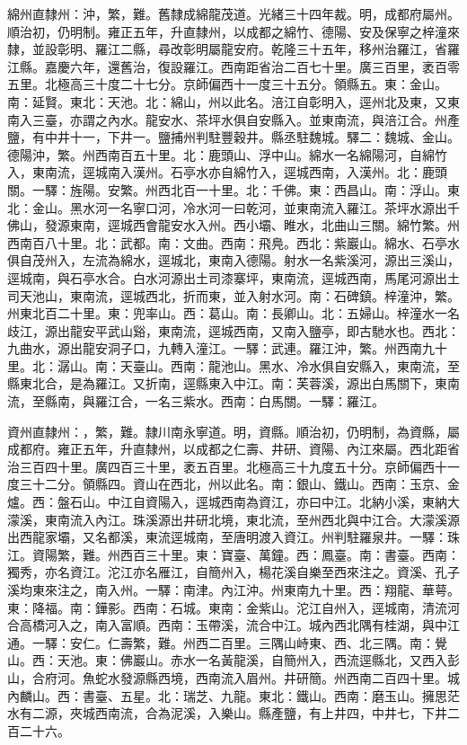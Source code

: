\begin{pinyinscope}
綿州直隸州：沖，繁，難。舊隸成綿龍茂道。光緒三十四年裁。明，成都府屬州。順治初，仍明制。雍正五年，升直隸州，以成都之綿竹、德陽、安及保寧之梓潼來隸，並設彰明、羅江二縣，尋改彰明屬龍安府。乾隆三十五年，移州治羅江，省羅江縣。嘉慶六年，還舊治，復設羅江。西南距省治二百七十里。廣三百里，袤百零五里。北極高三十度二十七分。京師偏西十一度三十五分。領縣五。東：金山。南：延賢。東北：天池。北：綿山，州以此名。涪江自彰明入，逕州北及東，又東南入三臺，亦謂之內水。龍安水、茶坪水俱自安縣入。並東南流，與涪江合。州產鹽，有中井十一，下井一。鹽捕州判駐豐穀井。縣丞駐魏城。驛二：魏城、金山。德陽沖，繁。州西南百五十里。北：鹿頭山、浮中山。綿水一名綿陽河，自綿竹入，東南流，逕城南入漢州。石亭水亦自綿竹入，逕城西南，入漢州。北：鹿頭關。一驛：旌陽。安繁。州西北百一十里。北：千佛。東：西昌山。南：浮山。東北：金山。黑水河一名寧口河，冷水河一曰乾河，並東南流入羅江。茶坪水源出千佛山，發源東南，逕城西會龍安水入州。西小壩、睢水，北曲山三關。綿竹繁。州西南百八十里。北：武都。南：文曲。西南：飛鳧。西北：紫巖山。綿水、石亭水俱自茂州入，左流為綿水，逕城北，東南入德陽。射水一名紫溪河，源出三溪山，逕城南，與石亭水合。白水河源出土司漆寨坪，東南流，逕城西南，馬尾河源出土司天池山，東南流，逕城西北，折而東，並入射水河。南：石碑鎮。梓潼沖，繁。州東北百二十里。東：兜率山。西：葛山。南：長卿山。北：五婦山。梓潼水一名歧江，源出龍安平武山谿，東南流，逕城西南，又南入鹽亭，即古馳水也。西北：九曲水，源出龍安洞子口，九轉入潼江。一驛：武連。羅江沖，繁。州西南九十里。北：潺山。南：天臺山。西南：龍池山。黑水、冷水俱自安縣入，東南流，至縣東北合，是為羅江。又折南，逕縣東入中江。南：芙蓉溪，源出白馬關下，東南流，至縣南，與羅江合，一名三紫水。西南：白馬關。一驛：羅江。

資州直隸州：，繁，難。隸川南永寧道。明，資縣。順治初，仍明制，為資縣，屬成都府。雍正五年，升直隸州，以成都之仁壽、井研、資陽、內江來屬。西北距省治三百四十里。廣四百三十里，袤五百里。北極高三十九度五十分。京師偏西十一度三十二分。領縣四。資山在西北，州以此名。南：銀山、鐵山。西南：玉京、金爐。西：盤石山。中江自資陽入，逕城西南為資江，亦曰中江。北納小溪，東納大濛溪，東南流入內江。珠溪源出井研北境，東北流，至州西北與中江合。大濛溪源出西龍家壩，又名都溪，東流逕城南，至唐明渡入資江。州判駐羅泉井。一驛：珠江。資陽繁，難。州西百三十里。東：寶臺、萬鐘。西：鳳臺。南：書臺。西南：獨秀，亦名資江。沱江亦名雁江，自簡州入，楊花溪自樂至西來注之。資溪、孔子溪均東來注之，南入州。一驛：南津。內江沖。州東南九十里。西：翔龍、華萼。東：降福。南：鏵影。西南：石城。東南：金紫山。沱江自州入，逕城南，清流河合高橋河入之，南入富順。西南：玉帶溪，流合中江。城內西北隅有桂湖，與中江通。一驛：安仁。仁壽繁，難。州西二百里。三隅山峙東、西、北三隅。南：覺山。西：天池。東：佛巖山。赤水一名黃龍溪，自簡州入，西流逕縣北，又西入彭山，合府河。魚蛇水發源縣西境，西南流入眉州。井研簡。州西南二百四十里。城內麟山。西：書臺、五星。北：瑞芝、九龍。東北：鐵山。西南：磨玉山。擁思茫水有二源，夾城西南流，合為泥溪，入樂山。縣產鹽，有上井四，中井七，下井二百二十六。


\end{pinyinscope}
